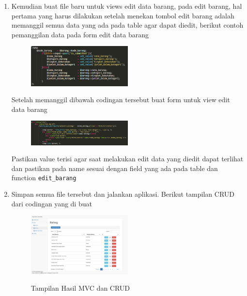 \begin{enumerate}
\begin{enumerate}
    	\item Kemudian buat file baru untuk views edit data barang, pada edit barang, hal pertama yang harus dilakukan setelah menekan tombol edit barang adalah memanggil semua data yang ada pada table agar dapat diedit, berikut contoh pemanggilan data pada form edit data barang
    		\begin{figure}[!htbp]
        		\centering
        		\includegraphics[width=0.5\textwidth]{figures/Views3.PNG}
        		\label{Views3}
    		\end{figure}
    		\par Setelah memanggil dibawah codingan tersebut buat form untuk view edit data barang
    		\begin{figure}[!htbp]
        		\centering
        		\includegraphics[width=0.5\textwidth]{figures/Views4.PNG}
        		\label{Views4}
    		\end{figure}
    		\par Pastikan value terisi agar saat melakukan edit data yang diedit dapat terlihat dan pastikan pada name sesuai dengan field yang ada pada table dan function \verb|edit_barang|
    		
    	\item Simpan semua file tersebut dan jalankan aplikasi. Berikut tampilan CRUD dari codingan yang di buat
    		\begin{figure}[!htbp]
        		\centering
        		\caption{Tampilan Hasil MVC dan CRUD}
        		\includegraphics[width=0.5\textwidth]{figures/Views5.png}
        		\label{Views5}
    		\end{figure}
    \end{enumerate}
\end{enumerate}